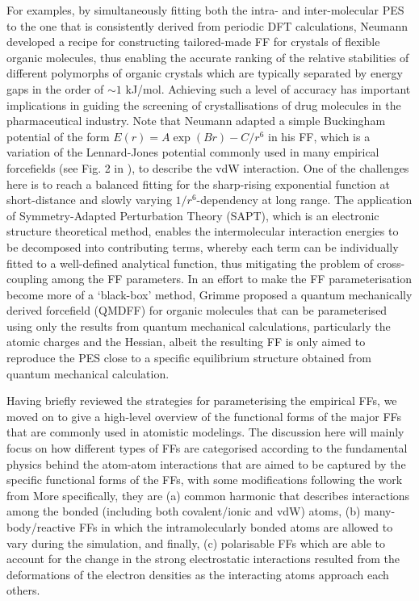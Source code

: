 For examples, by simultaneously fitting both the intra- and inter-molecular PES to the one that is consistently derived from periodic DFT calculations, Neumann\cite{neumann2008tailor} developed a recipe for constructing tailored-made FF for crystals of flexible organic molecules, thus enabling the accurate ranking of the relative stabilities of different polymorphs of organic crystals which are typically separated by energy gaps in the order of $\sim 1$ kJ/mol. Achieving such a level of accuracy has important implications in   guiding the screening of crystallisations of drug molecules in the pharmaceutical industry.\cite{neumann2015combined} Note that Neumann adapted a simple Buckingham\cite{buckingham1938classical} potential of the form $E(r)=A\exp(Br)-C/r^6$ in his FF, which is a variation of the Lennard-Jones potential commonly used in many empirical forcefields (see Fig. 2 in \citet{heinz2013thermodynamically}),  to describe the vdW interaction.  One of the challenges here is to reach a balanced fitting for the sharp-rising exponential function at short-distance and slowly varying $1/r^6$-dependency at long range. The application of Symmetry-Adapted Perturbation Theory (SAPT)\cite{misquitta2005intermolecular}, which is an electronic structure theoretical method, enables the intermolecular interaction energies to be decomposed into  contributing terms, whereby each term can be individually fitted to a well-defined analytical function,\cite{misquitta2016ab} thus mitigating the problem of cross-coupling among the FF parameters. In an effort to make the FF parameterisation become more of a `black-box' method, Grimme proposed a quantum mechanically derived forcefield (QMDFF) for organic molecules that can be parameterised using only the results from quantum mechanical calculations,\cite{grimme2014general} particularly the atomic charges and the Hessian, albeit the resulting FF is only aimed to reproduce the PES close to a specific equilibrium structure obtained from quantum mechanical calculation. 

Having briefly reviewed the strategies for parameterising the empirical FFs, we moved on to give a high-level overview of the functional forms of the major FFs that are commonly used in atomistic modelings. The discussion here will mainly focus on how different types of  FFs are categorised according to the fundamental physics behind the atom-atom interactions that are aimed to be captured by the specific functional forms of the FFs, with some modifications following the work from \citet{heinz2013thermodynamically} More specifically, they are (a) common harmonic that describes interactions among the bonded (including both covalent/ionic and vdW) atoms, (b)  many-body/reactive FFs in which the intramolecularly bonded atoms are allowed to vary during the simulation, and finally, (c) polarisable FFs which are able to account for the change in the strong electrostatic interactions resulted from the deformations of the electron densities as the interacting atoms approach each others. 


